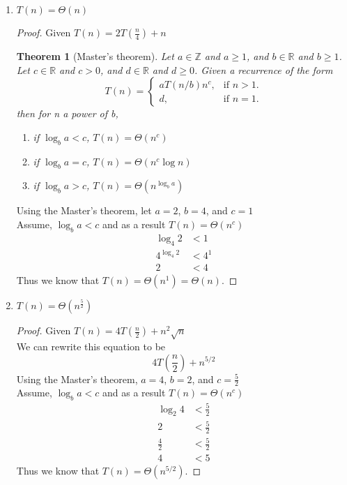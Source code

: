 \documentclass[paper=a4, fontsize=11pt]{scrartcl} %
\numberwithin{equation}{section} %
\numberwithin{figure}{section} %
\numberwithin{table}{section} %
\newtheorem{theorem}{Theorem}[section]
\begin{document}
\begin{enumerate}
\begin{enumerate}
    \item $T(n) = \Theta(n)$
    \begin{proof}
        Given $T(n) = 2T(\frac{ n }{ 4 }) + n$ \\
        \begin{theorem}[Master's theorem]
            Let $a \in \mathbb{Z}$ and $a \geq 1$, and $b \in \mathbb{R}$ and 
            $b \geq 1$. Let $c \in \mathbb{R}$ and $c > 0$, and 
            $d \in \mathbb{R}$ and $d \geq 0$. Given a recurrence of the form
        \[
            T(n) = 
            \begin{cases}
                aT(n/b) n^c, & \text{if $n > 1$}.\\
                d, & \text{if $n = 1$}.
            \end{cases} 
        \]
        then for n a power of b,
        \begin{enumerate}
            \item if $\log_b{a} < c$, $T(n) = \Theta\left(n^c\right)$
            \item if $\log_b{a} = c$, $T(n) = \Theta\left(n^c\log{n}\right)$
            \item if $\log_b{a} > c$, $T(n) = \Theta\left(n^{ \log_b{a} }\right)$
        \end{enumerate}
        \end{theorem}
        Using the Master's theorem, let $a = 2$, $b = 4$, and $c = 1$ \\
        Assume, $\log_b{a} < c$ and as a result $T(n) = \Theta\left(n^c\right)$
        \begin{align*}
            \log_4{2} &< 1 \\
            4^{\log_4{2}} &< 4^1 \\
            2 &< 4
        \end{align*}
        Thus we know that $T(n) = \Theta\left(n^1\right) = \Theta(n)$.
    \end{proof}

    \item $T(n) = \Theta(n^{\frac{ 5 }{ 2 }})$
    \begin{proof}
        Given $T(n) = 4T(\frac{ n }{ 2 }) + n^2\sqrt{n}$ \\
        We can rewrite this equation to be
        \[ 4T(\frac{ n }{ 2 }) + n^{5/2} \]
        Using the Master's theorem, $a = 4$, $b = 2$, and $c = \frac{5}{2}$ \\
        Assume, $\log_b{a} < c$ and as a result $T(n) = \Theta\left(n^c\right)$
        \begin{align*}
            \log_2{4} & < \frac{5}{2} \\
            2 & < \frac{5}{2} \\
            \frac{4}{2} & < \frac{5}{2} \\
            4 & < 5
        \end{align*}
        Thus we know that $T(n) = \Theta\left(n^{5/2}\right)$.
    \end{proof}
    \end{enumerate}


\end{enumerate}
\end{document}

